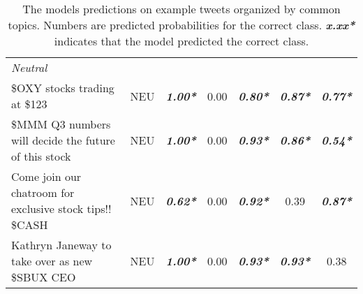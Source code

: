 \begin{table}[!ht]
\begin{tabular}{m{7.37cm}cccccc}
\cmidrule(l){1-1}
\emph{Neutral} \\
\cmidrule(l){1-7}
\$OXY stocks trading at \$123 & NEU & \emph{\textbf{1.00*}} & 0.00 & \emph{\textbf{0.80*}} & \emph{\textbf{0.87*}} & \emph{\textbf{0.77*}} \\
\$MMM Q3 numbers will decide the future of this stock & NEU & \emph{\textbf{1.00*}} & 0.00 & \emph{\textbf{0.93*}} & \emph{\textbf{0.86*}} & \emph{\textbf{0.54*}} \\
Come join our chatroom for exclusive stock tips!! \$CASH & NEU & \emph{\textbf{0.62*}} & 0.00 & \emph{\textbf{0.92*}} & 0.39 & \emph{\textbf{0.87*}} \\
Kathryn Janeway to take over as new \$SBUX CEO & NEU & \emph{\textbf{1.00*}} & 0.00 & \emph{\textbf{0.93*}} & \emph{\textbf{0.93*}} & 0.38 \\



	\bottomrule
	\end{tabular}
	\caption{The models predictions on example tweets organized by common topics. Numbers are predicted probabilities for the correct class. \emph{\textbf{x.xx*}} indicates that the model predicted the correct class.}
	\label{table-example-tweets}
\end{table}